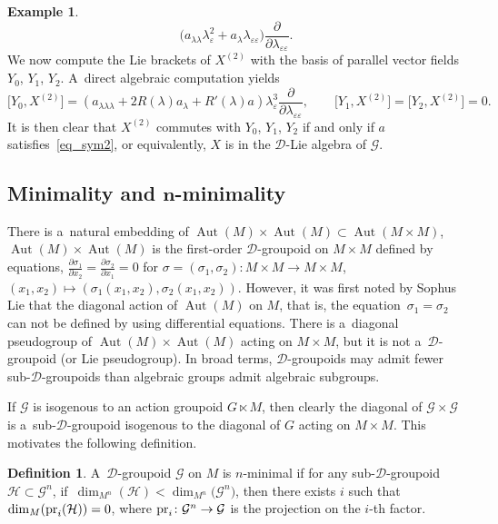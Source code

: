 \documentclass[pdftex]{sigma}
\numberwithin{equation}{section}
\theoremstyle{definition}
\newtheorem{Definition}[Theorem]{Definition}
\newtheorem{Example}[Theorem]{Example}
\begin{document}
\begin{Example}
\[\bigl(a_{\lambda\lambda} \lambda_\varepsilon^2 + a_\lambda \lambda_{\varepsilon\varepsilon}\bigr)\frac{\partial}{\partial \lambda_{\varepsilon\varepsilon}}.\]
We now compute the Lie brackets of $X^{(2)}$ with the basis of parallel vector fields $Y_0$, $Y_1$, $Y_2$. A~direct algebraic computation yields
\[
\big[Y_0, X^{(2)}\big] = (a_{\lambda\lambda\lambda} + 2R(\lambda)a_\lambda + R'(\lambda)a)\lambda_\varepsilon^3 \frac{\partial}{\partial \lambda_{\varepsilon\varepsilon}}, \qquad \big[Y_1,X^{(2)}\big] = \big[Y_2,X^{(2)}\big] = 0.\]
It is then clear that $X^{(2)}$ commutes with $Y_0$, $Y_1$, $Y_2$ if and only if $a$ satisfies~\eqref{eq_sym2}, or equivalently, $X$ is in the $\mathcal D$-Lie algebra of $\mathcal G$.
\end{Example}

\subsection[Minimality and n-minimality]{Minimality and $\boldsymbol{n}$-minimality}

There is a~natural embedding of $\operatorname{Aut}(M)\times\operatorname{Aut}(M) \subset \operatorname{Aut}(M\times M)$,
$\operatorname{Aut}(M)\times \operatorname{Aut}(M)$ is the first-order $\mathcal D$-groupoid on $M\times M$ defined by equations,
$\frac{\partial \sigma_1}{\partial x_2}= \frac{\partial \sigma_2}{\partial x_1} = 0$
for $\sigma = (\sigma_1,\sigma_2) \colon M\times M \to M\times M$, $(x_1,x_2) \mapsto (\sigma_1(x_1,x_2),\sigma_2(x_1,x_2))$. However, it was first noted by Sophus Lie that the diagonal action of $\operatorname{Aut}(M)$ on $M$, that is, the equation~${\sigma_1 = \sigma_2}$ can not be defined by using differential equations. There is a~diagonal pseudogroup of $\operatorname{Aut}(M)\times \operatorname{Aut}(M)$ acting on $M\times M$, but it is not a~$\mathcal D$-groupoid (or Lie pseudogroup). In broad terms, $\mathcal D$-groupoids may admit fewer sub-$\mathcal D$-groupoids than algebraic groups admit algebraic subgroups.

If $\mathcal G$ is isogenous to an action groupoid $G\ltimes M$, then clearly the diagonal of $\mathcal G\times \mathcal G$ is a~sub-$\mathcal D$-groupoid isogenous to the diagonal of $G$ acting on $M\times M$. This motivates the following definition.

\begin{Definition}\label{def_minimal}
 A~$\mathcal D$-groupoid $\mathcal G$ on $M$ is $n$-minimal if for any sub-$\mathcal D$-groupoid $\mathcal H \subset \mathcal G^n$, if~${\dim_{M^n} (\mathcal H)< \dim_{M^n}\bigl(\mathcal G^n\bigr)}$, then there exists $i$ such that $\dim_M({\rm pr}_i(\mathcal H)) =0$, where ${\rm pr}_i \colon \mathcal G^n \to \mathcal G$ is the projection on the $i$-th factor.
\end{Definition}
\end{document}
